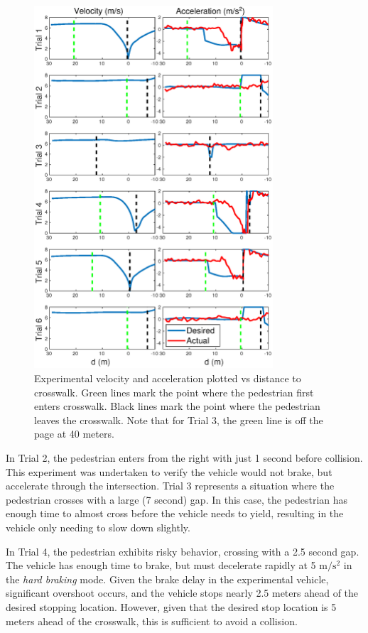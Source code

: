 \documentclass[letterpaper, 10 pt, conference]{ieeeconf} %
\begin{document}
\begin{figure}[h]
\centering
\includegraphics[width=3.5in]{expPlot.eps}
\caption{Experimental velocity and acceleration plotted vs distance to crosswalk. Green lines mark the point where the pedestrian first enters crosswalk. Black lines mark the point where the pedestrian leaves the crosswalk. Note that for Trial 3, the green line is off the page at 40 meters.}
\label{fig:expPlot}
\end{figure}

In Trial 2, the pedestrian enters from the right with just 1 second before collision. This experiment was undertaken to verify the vehicle would not brake, but accelerate through the intersection. Trial 3 represents a situation where the pedestrian crosses with a large (7 second) gap. In this case, the pedestrian has enough time to almost cross before the vehicle needs to yield, resulting in the vehicle only needing to slow down slightly. 

In Trial 4, the pedestrian exhibits risky behavior, crossing with a 2.5 second gap. The vehicle has enough time to brake, but must decelerate rapidly at 5 $\mathrm{m/s^2}$ in the \textit{hard braking} mode. Given the brake delay in the experimental vehicle, significant overshoot occurs, and the vehicle stops nearly 2.5 meters ahead of the desired stopping location. However, given that the desired stop location is 5 meters ahead of the crosswalk, this is sufficient to avoid a collision.
\end{document}
